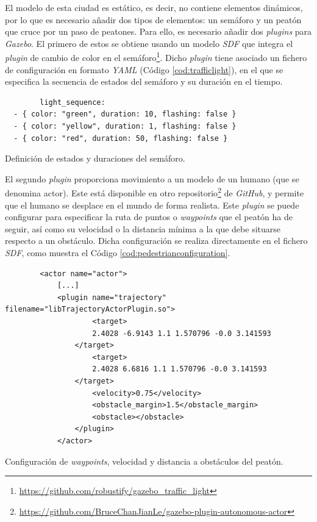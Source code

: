 El modelo de esta ciudad es estático, es decir, no contiene elementos dinámicos, por lo que es necesario añadir dos tipos de elementos: un semáforo y un peatón que cruce por un paso de peatones. Para ello, es necesario añadir dos \textit{plugins} para \textit{Gazebo}. El primero de estos se obtiene usando un modelo \textit{SDF} que integra el \textit{plugin} de cambio de color en el semáforo\footnote{\url{https://github.com/robustify/gazebo_traffic_light}}. Dicho \textit{plugin} tiene asociado un fichero de configuración en formato \textit{YAML} (Código \ref{cod:trafficlight}), en el que se especifica la secuencia de estados del semáforo y su duración en el tiempo.\\

\begin{code}[h]
	\begin{lstlisting}
		light_sequence:
  - { color: "green", duration: 10, flashing: false }
  - { color: "yellow", duration: 1, flashing: false }
  - { color: "red", duration: 50, flashing: false }
	\end{lstlisting}
	\caption[Definición de estados y duraciones del semáforo.]{Definición de estados y duraciones del semáforo.}
	\label{cod:trafficlight}
\end{code}

El segundo \textit{plugin} proporciona movimiento a un modelo de un humano (que se denomina actor). Este está disponible en otro repositorio\footnote{\url{https://github.com/BruceChanJianLe/gazebo-plugin-autonomous-actor}} de \textit{GitHub}, y permite que el humano se desplace en el mundo de forma realista. Este \textit{plugin} se puede configurar para especificar la ruta de puntos o \textit{waypoints} que el peatón ha de seguir, así como su velocidad o la distancia mínima a la que debe situarse respecto a un obstáculo. Dicha configuración se realiza directamente en el fichero \textit{SDF}, como muestra el Código \ref{cod:pedestrianconfiguration}.\\

\begin{code}[h]
	\begin{lstlisting}
		<actor name="actor">
			[...]
			<plugin name="trajectory" filename="libTrajectoryActorPlugin.so">
					<target>
					2.4028 -6.9143 1.1 1.570796 -0.0 3.141593
				</target>
					<target>
					2.4028 6.6816 1.1 1.570796 -0.0 3.141593
				</target>
					<velocity>0.75</velocity>
					<obstacle_margin>1.5</obstacle_margin>
					<obstacle></obstacle>
				</plugin>
			</actor>
	\end{lstlisting}
	\caption[Configuración de \textit{waypoints}, velocidad y distancia a obstáculos del peatón.]{Configuración de \textit{waypoints}, velocidad y distancia a obstáculos del
		peatón.}
	\label{cod:pedestrianconfiguration}
\end{code}

